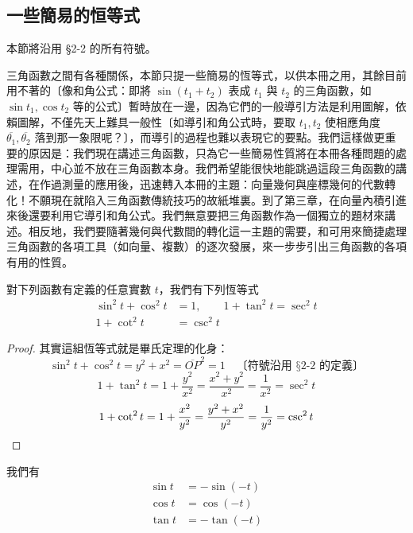 \subsection{一些簡易的恒等式}
\label{subsec:b3s-2-3}

本節將沿用 §2-2 的所有符號。

三角函數之間有各種關係，本節只提一些簡易的恆等式，以供本冊之用，其餘目前用不著的〔像和角公式：即將 $\sin(t_1 + t_2)$ 表成 $t_1$ 與 $t_2$ 的三角函數，如 $\sin t_1, \cos t_2$ 等的公式〕暫時放在一邊，因為它們的一般導引方法是利用圖解，依賴圖解，不僅先天上難具一般性〔如導引和角公式時，要取 $t_1, t_2$ 使相應角度 $\overline{\theta_1}, \overline{\theta_2}$ 落到那一象限呢？〕，而導引的過程也難以表現它的要點。我們這樣做更重要的原因是：我們現在講述三角函數，只為它一些簡易性質將在本冊各種問題的處理需用，中心並不放在三角函數本身。我們希望能很快地能跳過這段三角函數的講述，在作過測量的應用後，迅速轉入本冊的主題：向量幾何與座標幾何的代數轉化！不願現在就陷入三角函數傳統技巧的故紙堆裏。到了第三章，在向量內積引進來後還要利用它導引和角公式。我們無意要把三角函數作為一個獨立的題材來講述。相反地，我們要隨著幾何與代數間的轉化這一主題的需要，和可用來簡捷處理三角函數的各項工具（如向量、複數）的逐次發展，來一步步引出三角函數的各項有用的性質。

\begin{proposition}
對下列函數有定義的任意實數 $t$，我們有下列恆等式
\begin{align*}
\sin^2 t + \cos^2 t &= 1,\qquad 1 + \tan^2 t = \sec^2 t \\
1 + \cot^2 t &= \csc^2 t
\end{align*}
\end{proposition}

\begin{proof}
其實這組恆等式就是畢氏定理的化身：
\[ \sin^2 t + \cos^2 t = y^2 + x^2 = \overline{OP}^2 = 1 \quad\text{〔符號沿用 §2-2 的定義〕} \]
\[ 1 + \tan^2 t = 1 + \frac{y^2}{x^2} = \frac{x^2 + y^2}{x^2} = \frac{1}{x^2} = \sec^2 t \]
\[ 1 + \cot^2 t = 1 + \frac{x^2}{y^2} = \frac{y^2 + x^2}{y^2} = \frac{1}{y^2} = \csc^2 t \qedhere \]
\end{proof}

\begin{proposition}[負角公式]
我們有
\begin{align*}
\sin t &= -\sin(-t) \\
\cos t &= \cos(-t) \\
\tan t &= -\tan(-t)
\end{align*}
\end{proposition}

